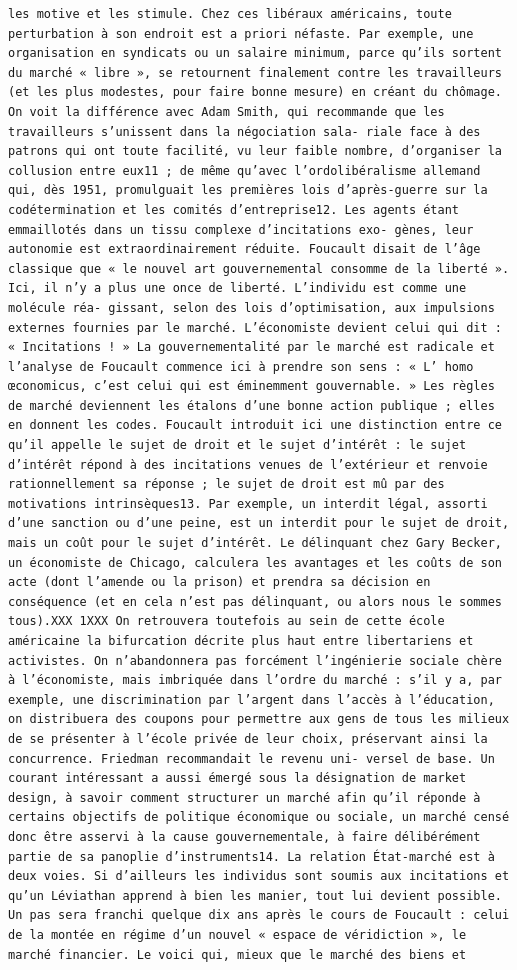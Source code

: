 \documentclass[
  letterpaper,
  DIV=11,
  numbers=noendperiod]{scrreprt}
\begin{document}
\begin{verbatim}
les motive et les stimule. Chez ces libéraux américains, toute perturbation à son endroit est a priori néfaste. Par exemple, une organisation en syndicats ou un salaire minimum, parce qu’ils sortent du marché « libre », se retournent finalement contre les travailleurs (et les plus modestes, pour faire bonne mesure) en créant du chômage. On voit la différence avec Adam Smith, qui recommande que les travailleurs s’unissent dans la négociation sala‑ riale face à des patrons qui ont toute facilité, vu leur faible nombre, d’organiser la collusion entre eux11 ; de même qu’avec l’ordolibéralisme allemand qui, dès 1951, promulguait les premières lois d’après‑guerre sur la codétermination et les comités d’entreprise12. Les agents étant emmaillotés dans un tissu complexe d’incitations exo‑ gènes, leur autonomie est extraordinairement réduite. Foucault disait de l’âge classique que « le nouvel art gouvernemental consomme de la liberté ». Ici, il n’y a plus une once de liberté. L’individu est comme une molécule réa‑ gissant, selon des lois d’optimisation, aux impulsions externes fournies par le marché. L’économiste devient celui qui dit : « Incitations ! » La gouvernementalité par le marché est radicale et l’analyse de Foucault commence ici à prendre son sens : « L’ homo œconomicus, c’est celui qui est éminemment gouvernable. » Les règles de marché deviennent les étalons d’une bonne action publique ; elles en donnent les codes. Foucault introduit ici une distinction entre ce qu’il appelle le sujet de droit et le sujet d’intérêt : le sujet d’intérêt répond à des incitations venues de l’extérieur et renvoie rationnellement sa réponse ; le sujet de droit est mû par des motivations intrinsèques13. Par exemple, un interdit légal, assorti d’une sanction ou d’une peine, est un interdit pour le sujet de droit, mais un coût pour le sujet d’intérêt. Le délinquant chez Gary Becker, un économiste de Chicago, calculera les avantages et les coûts de son acte (dont l’amende ou la prison) et prendra sa décision en conséquence (et en cela n’est pas délinquant, ou alors nous le sommes tous).XXX 1XXX On retrouvera toutefois au sein de cette école américaine la bifurcation décrite plus haut entre libertariens et activistes. On n’abandonnera pas forcément l’ingénierie sociale chère à l’économiste, mais imbriquée dans l’ordre du marché : s’il y a, par exemple, une discrimination par l’argent dans l’accès à l’éducation, on distribuera des coupons pour permettre aux gens de tous les milieux de se présenter à l’école privée de leur choix, préservant ainsi la concurrence. Friedman recommandait le revenu uni‑ versel de base. Un courant intéressant a aussi émergé sous la désignation de market design, à savoir comment structurer un marché afin qu’il réponde à certains objectifs de politique économique ou sociale, un marché censé donc être asservi à la cause gouvernementale, à faire délibérément partie de sa panoplie d’instruments14. La relation État‑marché est à deux voies. Si d’ailleurs les individus sont soumis aux incitations et qu’un Léviathan apprend à bien les manier, tout lui devient possible. Un pas sera franchi quelque dix ans après le cours de Foucault : celui de la montée en régime d’un nouvel « espace de véridiction », le marché financier. Le voici qui, mieux que le marché des biens et 
\end{verbatim}
\end{document}
